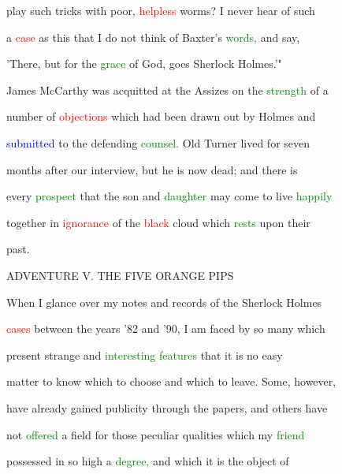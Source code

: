  play such \textcolor{BurntOrange}{tricks} with poor, \textcolor{red}{helpless} \textcolor{BurntOrange}{worms?} I never hear of such

 a \textcolor{red}{case} as this that I do not think of Baxter's \textcolor{green}{words,} and say,

 'There, but for the \textcolor{green}{grace} of \textcolor{BurntOrange}{God,} goes Sherlock Holmes.'"



 James McCarthy was acquitted at the Assizes on the \textcolor{green}{strength} of a

 number of \textcolor{red}{objections} which had been drawn out by Holmes and

 \textcolor{blue}{submitted} to the \textcolor{BurntOrange}{defending} \textcolor{green}{counsel.} Old Turner lived for seven

 months after our interview, but he is now dead; and there is

 every \textcolor{green}{prospect} that the son and \textcolor{green}{daughter} may come to live \textcolor{green}{happily}

 together in \textcolor{red}{ignorance} of the \textcolor{red}{black} cloud which \textcolor{green}{rests} upon their

 past.







 \textcolor{BurntOrange}{ADVENTURE} V. THE FIVE ORANGE PIPS



 When I glance over my notes and records of the Sherlock Holmes

 \textcolor{red}{cases} between the years '82 and '90, I am faced by so many which

 \textcolor{BurntOrange}{present} strange and \textcolor{green}{interesting} \textcolor{green}{features} that it is no easy

 matter to know which to choose and which to \textcolor{BurntOrange}{leave.} Some, however,

 have already \textcolor{BurntOrange}{gained} publicity through the papers, and others have

 not \textcolor{green}{offered} a field for those peculiar qualities which my \textcolor{green}{friend}

 \textcolor{BurntOrange}{possessed} in so high a \textcolor{green}{degree,} and which it is the object of

